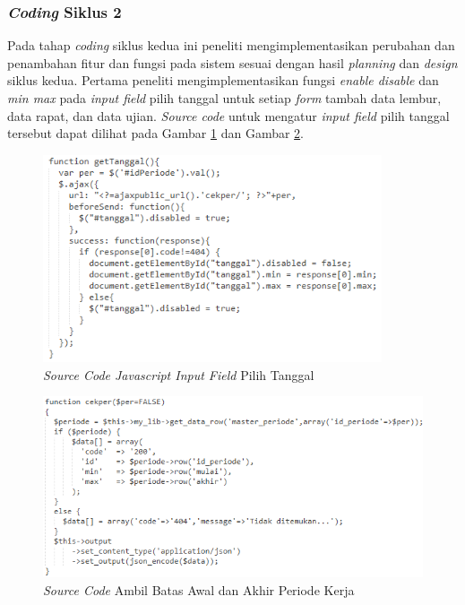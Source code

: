 	\subsubsection{\emph{Coding} Siklus 2}
	Pada tahap \emph{coding} siklus kedua ini peneliti mengimplementasikan perubahan dan penambahan fitur dan fungsi pada sistem sesuai dengan hasil \emph{planning} dan \emph{design} siklus kedua. Pertama peneliti mengimplementasikan fungsi \emph{enable disable} dan \emph{min max} pada \emph{input field} pilih tanggal untuk setiap \emph{form} tambah data lembur, data rapat, dan data ujian. \emph{Source code} untuk mengatur \emph{input field} pilih tanggal tersebut dapat dilihat pada Gambar \ref{coding_js_gettanggal} dan Gambar \ref{coding_gettanggal}.
	\begin{figure}[H]
	    \centering            		    \includegraphics[width=10cm]{gambar/coding/js-get-tanggal}
	    \caption{\emph{Source Code Javascript Input Field} Pilih Tanggal}
	    \label{coding_js_gettanggal}
    \end{figure}
    \begin{figure}[H]
	    \centering            		    \includegraphics[width=13cm]{gambar/coding/get-tanggal}
	    \caption{\emph{Source Code} Ambil Batas Awal dan Akhir Periode Kerja}
	    \label{coding_gettanggal}
    \end{figure}
	
